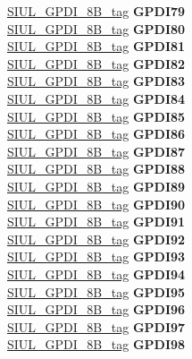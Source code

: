 \begin{DoxyCompactItemize}
\begin{tabbing}
\>\>\mbox{\hyperlink{unionSIUL__GPDI__8B__tag}{SIUL\_GPDI\_8B\_tag}} {\bfseries GPDI79}\\
\>\>\mbox{\hyperlink{unionSIUL__GPDI__8B__tag}{SIUL\_GPDI\_8B\_tag}} {\bfseries GPDI80}\\
\>\>\mbox{\hyperlink{unionSIUL__GPDI__8B__tag}{SIUL\_GPDI\_8B\_tag}} {\bfseries GPDI81}\\
\>\>\mbox{\hyperlink{unionSIUL__GPDI__8B__tag}{SIUL\_GPDI\_8B\_tag}} {\bfseries GPDI82}\\
\>\>\mbox{\hyperlink{unionSIUL__GPDI__8B__tag}{SIUL\_GPDI\_8B\_tag}} {\bfseries GPDI83}\\
\>\>\mbox{\hyperlink{unionSIUL__GPDI__8B__tag}{SIUL\_GPDI\_8B\_tag}} {\bfseries GPDI84}\\
\>\>\mbox{\hyperlink{unionSIUL__GPDI__8B__tag}{SIUL\_GPDI\_8B\_tag}} {\bfseries GPDI85}\\
\>\>\mbox{\hyperlink{unionSIUL__GPDI__8B__tag}{SIUL\_GPDI\_8B\_tag}} {\bfseries GPDI86}\\
\>\>\mbox{\hyperlink{unionSIUL__GPDI__8B__tag}{SIUL\_GPDI\_8B\_tag}} {\bfseries GPDI87}\\
\>\>\mbox{\hyperlink{unionSIUL__GPDI__8B__tag}{SIUL\_GPDI\_8B\_tag}} {\bfseries GPDI88}\\
\>\>\mbox{\hyperlink{unionSIUL__GPDI__8B__tag}{SIUL\_GPDI\_8B\_tag}} {\bfseries GPDI89}\\
\>\>\mbox{\hyperlink{unionSIUL__GPDI__8B__tag}{SIUL\_GPDI\_8B\_tag}} {\bfseries GPDI90}\\
\>\>\mbox{\hyperlink{unionSIUL__GPDI__8B__tag}{SIUL\_GPDI\_8B\_tag}} {\bfseries GPDI91}\\
\>\>\mbox{\hyperlink{unionSIUL__GPDI__8B__tag}{SIUL\_GPDI\_8B\_tag}} {\bfseries GPDI92}\\
\>\>\mbox{\hyperlink{unionSIUL__GPDI__8B__tag}{SIUL\_GPDI\_8B\_tag}} {\bfseries GPDI93}\\
\>\>\mbox{\hyperlink{unionSIUL__GPDI__8B__tag}{SIUL\_GPDI\_8B\_tag}} {\bfseries GPDI94}\\
\>\>\mbox{\hyperlink{unionSIUL__GPDI__8B__tag}{SIUL\_GPDI\_8B\_tag}} {\bfseries GPDI95}\\
\>\>\mbox{\hyperlink{unionSIUL__GPDI__8B__tag}{SIUL\_GPDI\_8B\_tag}} {\bfseries GPDI96}\\
\>\>\mbox{\hyperlink{unionSIUL__GPDI__8B__tag}{SIUL\_GPDI\_8B\_tag}} {\bfseries GPDI97}\\
\>\>\mbox{\hyperlink{unionSIUL__GPDI__8B__tag}{SIUL\_GPDI\_8B\_tag}} {\bfseries GPDI98}\\

\end{tabbing}
\end{DoxyCompactItemize}

